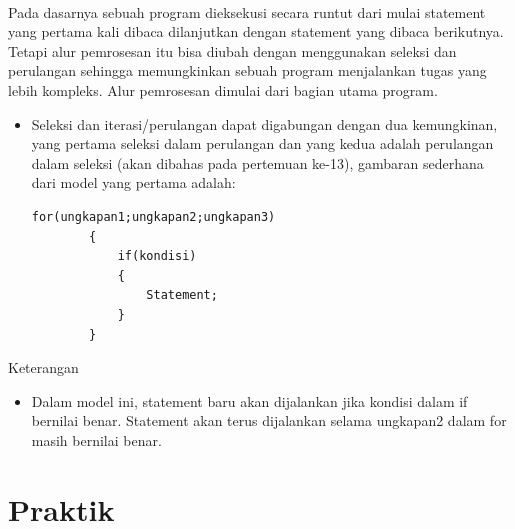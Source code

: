 \documentclass[a4paper,12pt]{article}
\begin{document}
\paragraph{}
Pada dasarnya sebuah program dieksekusi secara runtut dari mulai statement yang
pertama kali dibaca dilanjutkan dengan statement yang dibaca berikutnya.
Tetapi alur pemrosesan itu bisa diubah dengan menggunakan seleksi dan
perulangan sehingga memungkinkan sebuah program menjalankan tugas yang lebih
kompleks.
Alur pemrosesan dimulai dari bagian utama program.
\begin{itemize}[label=*.] 
    \item Seleksi dan iterasi/perulangan dapat digabungan dengan dua kemungkinan,
    yang pertama seleksi dalam perulangan dan yang kedua adalah perulangan
    dalam seleksi (akan dibahas pada pertemuan ke-13), gambaran sederhana dari
    model yang pertama adalah:
    \begin{lstlisting}[frame=single]
        for(ungkapan1;ungkapan2;ungkapan3)
        {
            if(kondisi)
            {
                Statement;
            }
        }
    \end{lstlisting}
\end{itemize}
Keterangan
\begin{itemize}[label=*.]
    \item Dalam model ini, statement baru akan dijalankan jika kondisi dalam if bernilai
benar. Statement akan terus dijalankan selama ungkapan2 dalam for masih
bernilai benar.
\end{itemize}
\newpage
\section{Praktik}
\end{document}
